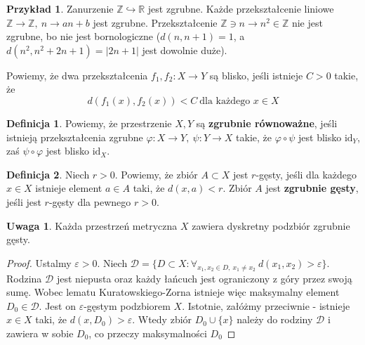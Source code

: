 \documentclass[licencjacka]{pracamgr}
\theoremstyle{definition}
\newtheorem{definition}{Definicja}[section]
\theoremstyle{definition}
\newtheorem{remark}{Uwaga}[section]
\theoremstyle{definition}
\theoremstyle{definition}
\newtheorem{example}{Przykład}[section]
\theoremstyle{definition}
\theoremstyle{plain}
\theoremstyle{plain}
\begin{document}
\begin{example}
	Zanurzenie $ \mathbb{Z} \hookrightarrow \mathbb{R} $ jest zgrubne. Każde 
	przekształcenie liniowe $ \mathbb{Z} \rightarrow \mathbb{Z}, ~ n \rightarrow
	an + b$ jest zgrubne. Przekształcenie $ \mathbb{Z} \ni n \rightarrow n^2 \in 
	\mathbb{Z} $ nie jest zgrubne, bo nie jest bornologiczne ($ d(n, n+1) = 1 $, a 
	$ d(n^2, n^2 + 2n + 1) = |2n+1| $ jest dowolnie duże).
\end{example}

Powiemy, że dwa przekształcenia $ f_1, f_2 : X \rightarrow Y $ są blisko, 
jeśli istnieje $ C > 0 $ takie, że $$ d(f_1(x), f_2(x)) < C  ~ \text{dla każdego } x \in X$$ 
\begin{definition}
	Powiemy, że przestrzenie $ X,Y $ są \textbf{zgrubnie równoważne}, jeśli 
	istnieją przekształcenia zgrubne $ \varphi : X \rightarrow Y, 
	~ \psi : Y \rightarrow X  $ takie, że 
	$ \varphi \circ \psi $ jest blisko $ \text{id}_Y $, zaś $ \psi \circ \varphi $ jest blisko 
	$ \text{id}_X $.
\end{definition}

\begin{definition}
	Niech $ r > 0$. Powiemy, że
	zbiór $ A \subset X $ jest $ r $-gęsty, jeśli dla każdego $ x \in X $ istnieje 
	element $ a \in A $ taki, że $ d(x,a) < r $. Zbiór $ A $ jest \textbf{zgrubnie gęsty}, 
	jeśli jest $ r $-gęsty dla pewnego $ r > 0 $.
\end{definition}

\begin{remark}\label{rem:densesubset}
	Każda przestrzeń metryczna $ X $ zawiera dyskretny podzbiór zgrubnie gęsty.
\end{remark}
\begin{proof}
	Ustalmy $ \varepsilon > 0 $. Niech $ \mathcal{D} = \{D \subset X : \forall_{x_1, x_2 \in D, ~
	x_1 \neq x_2} ~ d(x_1, x_2) > \varepsilon \} $. Rodzina $ \mathcal{D} $ jest niepusta 
	oraz każdy łańcuch jest ograniczony z góry przez swoją sumę. Wobec lematu 
	Kuratowskiego-Zorna istnieje więc maksymalny element $D_0 \in \mathcal{D}$. 
	Jest on $ \varepsilon $-gęstym podzbiorem $ X $. 
	Istotnie, załóżmy przeciwnie - istnieje $ x \in X $ taki, że 
	$ d(x, D_0) > \varepsilon $. Wtedy zbiór $ D_0 \cup \{x\} $ należy do rodziny 
	$ \mathcal{D} $ i zawiera w sobie $ D_0 $, co przeczy maksymalności $ D_0 $
\end{proof}
\end{document}
